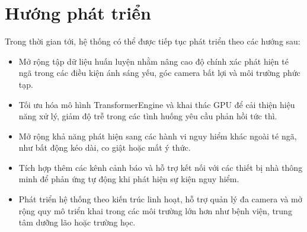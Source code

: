 \section{Hướng phát triển}

Trong thời gian tới, hệ thống có thể được tiếp tục phát triển theo các hướng sau:

\begin{itemize}
    \item Mở rộng tập dữ liệu huấn luyện nhằm nâng cao độ chính xác phát hiện
    té ngã trong các điều kiện ánh sáng yếu, góc camera bất lợi và môi trường
    phức tạp.

    \item Tối ưu hóa mô hình TransformerEngine và khai thác GPU để cải thiện
    hiệu năng xử lý, giảm độ trễ trong các tình huống yêu cầu phản hồi tức thì.

    \item Mở rộng khả năng phát hiện sang các hành vi nguy hiểm khác ngoài té
    ngã, như bất động kéo dài, co giật hoặc mất ý thức.

    \item Tích hợp thêm các kênh cảnh báo và hỗ trợ kết nối với các thiết bị
    nhà thông minh để phản ứng tự động khi phát hiện sự kiện nguy hiểm.

    \item Phát triển hệ thống theo kiến trúc linh hoạt, hỗ trợ quản lý đa camera
    và mở rộng quy mô triển khai trong các môi trường lớn hơn như bệnh viện,
    trung tâm dưỡng lão hoặc trường học.
\end{itemize}

